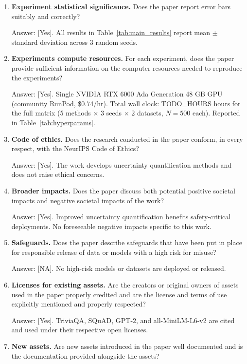\documentclass{article}
\begin{document}
\begin{enumerate}
\item \textbf{Experiment statistical significance.} Does the paper report error bars suitably and correctly?

Answer: [Yes]. All results in Table~\ref{tab:main_results} report mean $\pm$ standard deviation across 3 random seeds.

\item \textbf{Experiments compute resources.} For each experiment, does the paper provide sufficient information on the computer resources needed to reproduce the experiments?

Answer: [Yes]. Single NVIDIA RTX 6000 Ada Generation 48 GB GPU (community RunPod, \$0.74/hr). Total wall clock: TODO\_HOURS hours for the full matrix (5 methods $\times$ 3 seeds $\times$ 2 datasets, $N=500$ each). Reported in Table~\ref{tab:hyperparams}.

\item \textbf{Code of ethics.} Does the research conducted in the paper conform, in every respect, with the NeurIPS Code of Ethics?

Answer: [Yes]. The work develops uncertainty quantification methods and does not raise ethical concerns.

\item \textbf{Broader impacts.} Does the paper discuss both potential positive societal impacts and negative societal impacts of the work?

Answer: [Yes]. Improved uncertainty quantification benefits safety-critical deployments. No foreseeable negative impacts specific to this work.

\item \textbf{Safeguards.} Does the paper describe safeguards that have been put in place for responsible release of data or models with a high risk for misuse?

Answer: [NA]. No high-risk models or datasets are deployed or released.

\item \textbf{Licenses for existing assets.} Are the creators or original owners of assets used in the paper properly credited and are the license and terms of use explicitly mentioned and properly respected?

Answer: [Yes]. TriviaQA, SQuAD, GPT-2, and all-MiniLM-L6-v2 are cited and used under their respective open licenses.

\item \textbf{New assets.} Are new assets introduced in the paper well documented and is the documentation provided alongside the assets?


\end{enumerate}
\end{document}
